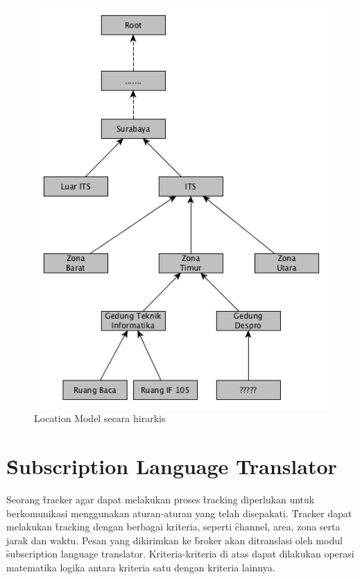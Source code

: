 \begin{figure}
    \centering
    \includegraphics[scale=0.60]
    {images/3-location-hierarchy.png}
    \caption{Location Model secara hirarkis}
\label{fig:location-hierarchy}
\end{figure}


\section{\f{Subscription Language Translator}}

Seorang \f{tracker} agar dapat melakukan proses \f{tracking} diperlukan untuk
berkomunikasi menggunakan aturan-aturan yang telah disepakati. \f{Tracker} dapat
melakukan \f{tracking} dengan berbagai kriteria, seperti \f{channel}, area, zona
serta jarak dan waktu. Pesan yang dikirimkan ke \f{broker} akan ditranslasi oleh
modul \f{subscription language translator}. Kriteria-kriteria di atas dapat
dilakukan operasi matematika logika antara kriteria satu dengan kriteria
lainnya.

